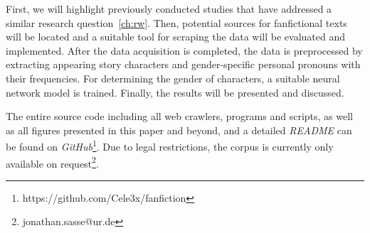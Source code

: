 First, we will highlight previously conducted studies that have addressed a similar research question~\ref{ch:rw}.
Then, potential sources for fanfictional texts will be located and a suitable tool for scraping the data will be evaluated and implemented.
After the data acquisition is completed, the data is preprocessed by extracting appearing story characters and gender-specific personal pronouns with their frequencies.
For determining the gender of characters, a suitable neural network model is trained. %
Finally, the results will be presented and discussed.

The entire source code including all web crawlers, programs and scripts, as well as all figures presented in this paper and beyond, and a detailed \emph{README} can be found on \emph{GitHub}\footnote{https://github.com/Cele3x/fanfiction}.
Due to legal restrictions, the corpus is currently only available on request\footnote{jonathan.sasse@ur.de}.
